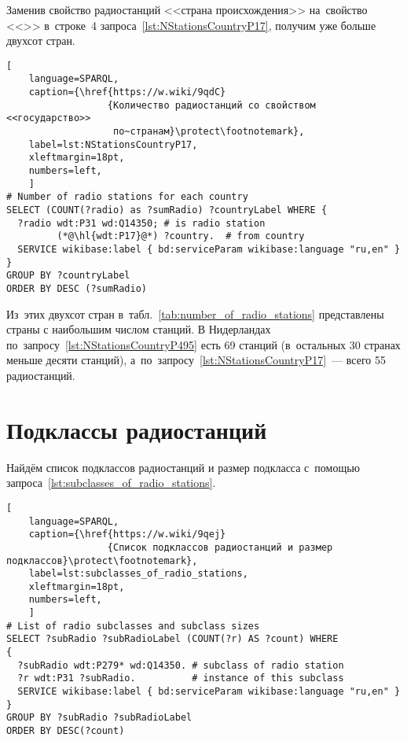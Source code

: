 Заменив свойство радиостанций <<страна происхождения>> 
на~свойство <<>> 
в~строке~4 запроса~\ref{lst:NStationsCountryP17}, 
получим уже больше двухсот стран. 

\begin{lstlisting}[ 
    language=SPARQL,
    caption={\href{https://w.wiki/9qdC}
                  {Количество радиостанций со свойством <<государство>>
                   по~странам}\protect\footnotemark},
    label=lst:NStationsCountryP17,
    xleftmargin=18pt,
    numbers=left,
    ]
# Number of radio stations for each country 
SELECT (COUNT(?radio) as ?sumRadio) ?countryLabel WHERE {
  ?radio wdt:P31 wd:Q14350; # is radio station
         (*@\hl{wdt:P17}@*) ?country.  # from country
  SERVICE wikibase:label { bd:serviceParam wikibase:language "ru,en" }
}
GROUP BY ?countryLabel
ORDER BY DESC (?sumRadio)
\end{lstlisting}%

Из~этих двухсот стран в~табл.~\ref{tab:number_of_radio_stations} 
представлены страны с наибольшим числом станций. 
В Нидерландах по~запросу~\ref{lst:NStationsCountryP495} есть 69 станций 
(в~остальных 30 странах меньше десяти станций), 
а~по~запросу~\ref{lst:NStationsCountryP17}~---  всего 55 радиостанций.



\section{Подклассы радиостанций}

Найдём список подклассов радиостанций и размер подкласса 
с~помощью запроса~\ref{lst:subclasses_of_radio_stations}.

\begin{lstlisting}[ 
    language=SPARQL,
    caption={\href{https://w.wiki/9qej}
                  {Список подклассов радиостанций и размер подклассов}\protect\footnotemark},
    label=lst:subclasses_of_radio_stations,
    xleftmargin=18pt,
    numbers=left,
    ]
# List of radio subclasses and subclass sizes
SELECT ?subRadio ?subRadioLabel (COUNT(?r) AS ?count) WHERE 
{
  ?subRadio wdt:P279* wd:Q14350. # subclass of radio station
  ?r wdt:P31 ?subRadio.          # instance of this subclass
  SERVICE wikibase:label { bd:serviceParam wikibase:language "ru,en" }
}
GROUP BY ?subRadio ?subRadioLabel
ORDER BY DESC(?count)
\end{lstlisting}%

